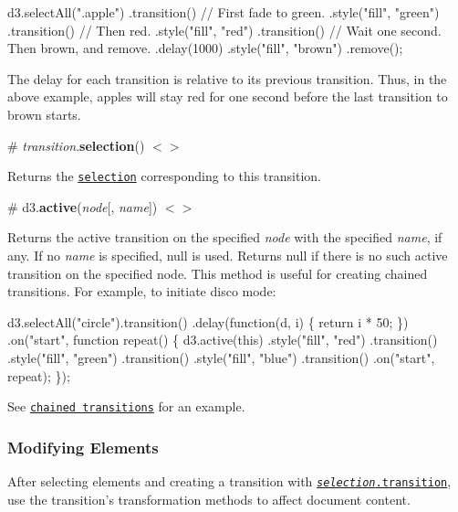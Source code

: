 \begin{DoxyCode}
d3.selectAll(".apple")
  .transition() // First fade to green.
    .style("fill", "green")
  .transition() // Then red.
    .style("fill", "red")
  .transition() // Wait one second. Then brown, and remove.
    .delay(1000)
    .style("fill", "brown")
    .remove();
\end{DoxyCode}


The delay for each transition is relative to its previous transition. Thus, in the above example, apples will stay red for one second before the last transition to brown starts.

\label{_transition_selection}%
\# {\itshape transition}.{\bfseries selection}() \href{https://github.com/d3/d3-transition/blob/master/src/transition/selection.js}{\tt $<$$>$}

Returns the \href{https://github.com/d3/d3-selection#selection}{\tt selection} corresponding to this transition.

\label{_active}%
\# d3.{\bfseries active}({\itshape node}\mbox{[}, {\itshape name}\mbox{]}) \href{https://github.com/d3/d3-transition/blob/master/src/active.js}{\tt $<$$>$}

Returns the active transition on the specified {\itshape node} with the specified {\itshape name}, if any. If no {\itshape name} is specified, null is used. Returns null if there is no such active transition on the specified node. This method is useful for creating chained transitions. For example, to initiate disco mode\+:


\begin{DoxyCode}
d3.selectAll("circle").transition()
    .delay(function(d, i) \{ return i * 50; \})
    .on("start", function repeat() \{
        d3.active(this)
            .style("fill", "red")
          .transition()
            .style("fill", "green")
          .transition()
            .style("fill", "blue")
          .transition()
            .on("start", repeat);
      \});
\end{DoxyCode}


See \href{http://bl.ocks.org/mbostock/70d5541b547cc222aa02}{\tt chained transitions} for an example.

\subsubsection*{Modifying Elements}

After selecting elements and creating a transition with \href{#selection_transition}{\tt {\itshape selection}.transition}, use the transition’s transformation methods to affect document content.

